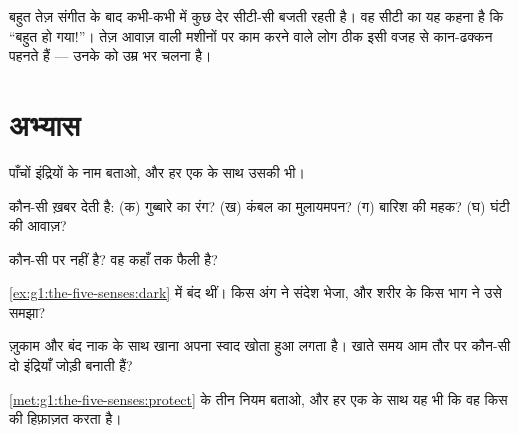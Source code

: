 \begin{example}[बग़ल वाला कार्यक्रम]\label{ex:g1:the-five-senses:loud}
बहुत तेज़ संगीत के बाद कभी-कभी  में कुछ देर सीटी-सी बजती रहती
है। वह सीटी  का यह कहना है कि ``बहुत हो गया!''। तेज़ आवाज़ वाली
मशीनों पर काम करने वाले लोग ठीक इसी वजह से कान-ढक्कन पहनते हैं ---
उनके  को उम्र भर चलना है।
\end{example}

\section{अभ्यास}

\begin{exercise}[$\star$]\label{exo:g1:the-five-senses:1}
पाँचों इंद्रियों के नाम बताओ, और हर एक के साथ उसकी  भी।
\end{exercise}

\begin{exercise}[$\star$]\label{exo:g1:the-five-senses:2}
कौन-सी  ख़बर देती है: (क) गुब्बारे का रंग? (ख) कंबल का
मुलायमपन? (ग) बारिश की महक? (घ) घंटी की आवाज़?
\end{exercise}

\begin{exercise}[$\star$]\label{exo:g1:the-five-senses:3}
कौन-सी   पर नहीं है? वह कहाँ तक फैली है?
\end{exercise}

\begin{exercise}[$\star$]\label{exo:g1:the-five-senses:4}
\cref{ex:g1:the-five-senses:dark} में  बंद थीं। किस अंग ने संदेश
भेजा, और शरीर के किस भाग ने उसे समझा?
\end{exercise}

\begin{exercise}[$\star$]\label{exo:g1:the-five-senses:5}
ज़ुकाम और बंद नाक के साथ खाना अपना स्वाद खोता हुआ लगता है। खाते समय
आम तौर पर कौन-सी दो इंद्रियाँ जोड़ी बनाती हैं?
\end{exercise}

\begin{exercise}[$\star$]\label{exo:g1:the-five-senses:6}
\cref{met:g1:the-five-senses:protect} के तीन नियम बताओ, और हर एक के
साथ यह भी कि वह किस  की हिफ़ाज़त करता है।
\end{exercise}

